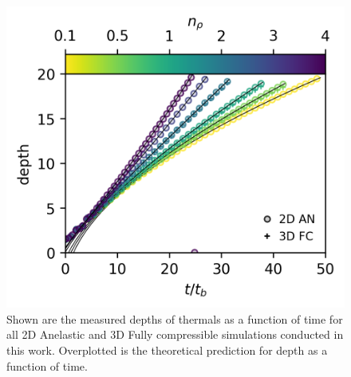 \documentclass[twocolumn, amsmath, amsfonts, amssymb, trackchanges]{aastex62}
\begin{document}
\begin{figure}[t!]
    \includegraphics[width=\columnwidth]{results_panels_d_v_t.png}
    \caption{
	Shown are the measured depths of thermals as a function of time for all 2D Anelastic and 3D Fully compressible simulations conducted in this work. 
	Overplotted is the theoretical prediction for depth as a function of time.
    \label{fig:results_d_v_t} }
\end{figure}
\end{document}
